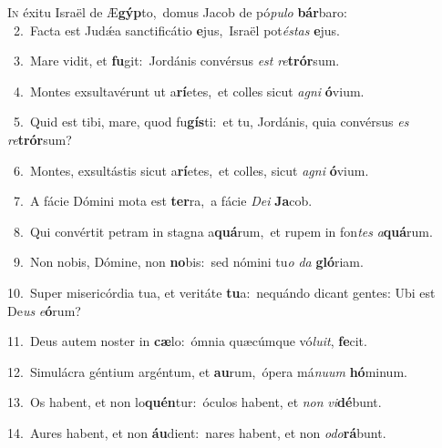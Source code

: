 \lettrine{\initial\textcolor{\initialcolor}{I}}{n} éxitu Israël de Æ\-\textbf{gýp}\-to,~\star domus Jacob de pó\-\textit{pu}\-\textit{lo} \textbf{bár}\-baro:\\
{\numbfont\textcolor{\numbcolor}{~2.}}~Facta est Judǽa sanctificátio \textbf{e}\-jus,~\star Israël pot\-\textit{és}\-\textit{tas} \textbf{e}\-jus.\par
{\numbfont\textcolor{\numbcolor}{~3.}}~Mare vidit, et \textbf{fu}\-git:~\star Jordánis convérsus \textit{est} \textit{re}\-\textbf{trór}sum.\par
{\numbfont\textcolor{\numbcolor}{~4.}}~Montes exsultavérunt ut a\-\textbf{rí}\-etes,~\star et colles sicut \textit{a}\-\textit{gni} \textbf{ó}\-vium.\par
{\numbfont\textcolor{\numbcolor}{~5.}}~Quid est tibi, mare, quod fu\-\textbf{gís}\-ti:~\star et tu, Jordánis, quia convérsus \textit{es} \textit{re}\-\textbf{trór}sum?\par
{\numbfont\textcolor{\numbcolor}{~6.}}~Montes, exsultástis sicut a\-\textbf{rí}\-etes,~\star et colles, sicut \textit{a}\-\textit{gni} \textbf{ó}\-vium.\par
{\numbfont\textcolor{\numbcolor}{~7.}}~A fácie Dómini mota est \textbf{ter}\-ra,~\star a fácie \textit{De}\-\textit{i} \textbf{Ja}\-cob.\par
{\numbfont\textcolor{\numbcolor}{~8.}}~Qui convértit petram in stagna a\-\textbf{quá}\-rum,~\star et rupem in fon\textit{tes} \textit{a}\-\textbf{quá}rum.\par
{\numbfont\textcolor{\numbcolor}{~9.}}~Non nobis, Dómine, non \textbf{no}\-bis:~\star sed nómini tu\textit{o} \textit{da} \textbf{gló}\-riam.\par
{\numbfont\textcolor{\numbcolor}{10.}}~Super misericórdia tua, et veritáte \textbf{tu}\-a:~\star nequándo dicant gentes: Ubi est De\textit{us} \textit{e}\-\textbf{ó}rum?\par
{\numbfont\textcolor{\numbcolor}{11.}}~Deus autem noster in \textbf{cæ}\-lo:~\star ómnia quæcúmque vó\-\textit{lu}\-\textit{it}, \textbf{fe}\-cit.\par
{\numbfont\textcolor{\numbcolor}{12.}}~Simulácra géntium argéntum, et \textbf{au}\-rum,~\star ópera má\-\textit{nu}\-\textit{um} \textbf{hó}\-minum.\par
{\numbfont\textcolor{\numbcolor}{13.}}~Os habent, et non lo\-\textbf{quén}\-tur:~\star óculos habent, et \textit{non} \textit{vi}\-\textbf{dé}bunt.\par
{\numbfont\textcolor{\numbcolor}{14.}}~Aures habent, et non \textbf{áu}\-dient:~\star nares habent, et non \textit{o}\-\textit{do}\textbf{rá}bunt.\par
